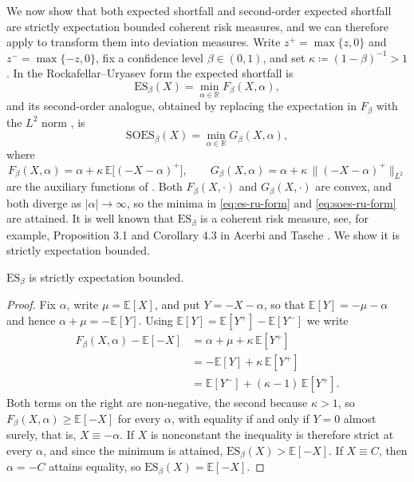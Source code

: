 We now show that both expected shortfall and second-order expected shortfall are strictly expectation bounded coherent risk measures, and we can therefore apply    
 to transform them into deviation measures. Write $z^{+} = \max\{z, 0\}$ and $z^{-} = \max\{-z, 0\}$, fix a confidence level
$\beta \in (0,1)$, and set $\kappa \coloneqq (1-\beta)^{-1} > 1$. 
In the Rockafellar--Uryasev form \cite{RockafellarUryasev2002} the expected shortfall is
\begin{equation}
\mathrm{ES}_\beta(X) = \min_{\alpha \in \mathbb{R}} F_\beta(X, \alpha),
\label{eq:es-ru-form} 
\end{equation}
and its second-order analogue, obtained by replacing the expectation in $F_\beta$ with the
$L^2$ norm \cite{Krokhmal2007}, is
\begin{equation}
\mathrm{SOES}_\beta(X) = \min_{\alpha \in \mathbb{R}} G_\beta(X, \alpha),
\label{eq:soes-ru-form}
\end{equation}
where
\begin{equation*}
F_\beta(X, \alpha) = \alpha + \kappa\, \mathbb{E}\big[(-X-\alpha)^{+}\big],
\qquad
G_\beta(X, \alpha) = \alpha + \kappa\, \big\| (-X-\alpha)^{+} \big\|_{L^2}
\end{equation*}
are the auxiliary functions of . Both $F_\beta(X, \cdot)$ and $G_\beta(X, \cdot)$ are convex, and both diverge as $|\alpha| \to \infty$, so
the minima in \eqref{eq:es-ru-form} and \eqref{eq:soes-ru-form} are attained. It is well known that $\mathrm{ES}_\beta$ is a coherent risk measure, see, for example, Proposition 3.1 and Corollary 4.3 in Acerbi and Tasche \cite{acerbi2002coherenceexpectedshortfall}. We show it is strictly expectation bounded. 

\begin{proposition}\label{prop:es-seb}
$\mathrm{ES}_\beta$ is strictly expectation bounded.
\end{proposition}

\begin{proof}
Fix $\alpha$, write $\mu = \mathbb{E}[X]$, and put $Y = -X - \alpha$, so that
$\mathbb{E}[Y] = -\mu - \alpha$ and hence $\alpha + \mu = -\mathbb{E}[Y]$. Using
$\mathbb{E}[Y] = \mathbb{E}[Y^{+}] - \mathbb{E}[Y^{-}]$ we write
\begin{align*}
F_\beta(X, \alpha) - \mathbb{E}[-X]
&= \alpha + \mu + \kappa\, \mathbb{E}[Y^{+}] \\
&= -\mathbb{E}[Y] + \kappa\, \mathbb{E}[Y^{+}]\\
&= \mathbb{E}[Y^{-}] + (\kappa - 1)\,\mathbb{E}[Y^{+}] .
\end{align*}
Both terms on the right are non-negative, the second because $\kappa > 1$, so
$F_\beta(X, \alpha) \geq \mathbb{E}[-X]$ for every $\alpha$, with equality if and only if
$Y = 0$ almost surely, that is, $X \equiv -\alpha$. If $X$ is nonconstant the inequality is
therefore strict at every $\alpha$, and since the
minimum is attained, $\mathrm{ES}_\beta(X) > \mathbb{E}[-X]$. If $X \equiv C$, then $\alpha = -C$ attains equality,
so $\mathrm{ES}_\beta(X) = \mathbb{E}[-X]$.
\end{proof}

